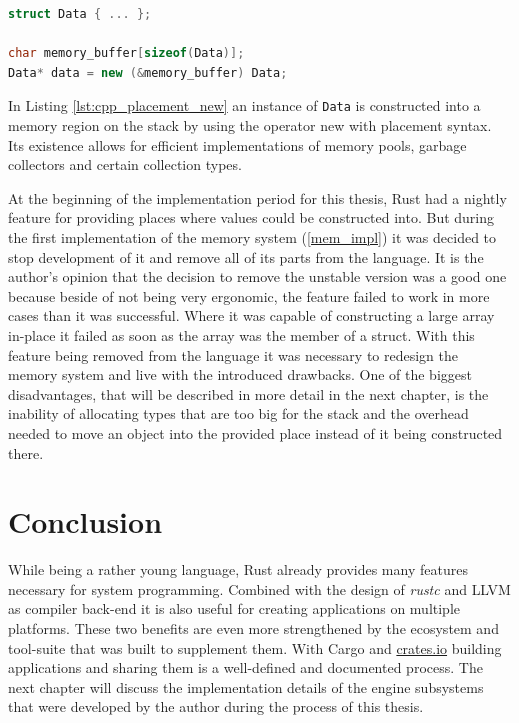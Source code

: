 \begin{lstlisting}[caption={Using placement-new to construct an object in a pre-allocated memory location}, label={lst:cpp_placement_new}, language=C++]
struct Data { ... };

char memory_buffer[sizeof(Data)];
Data* data = new (&memory_buffer) Data;
\end{lstlisting}

In Listing \ref{lst:cpp_placement_new} an instance of \texttt{Data} is constructed into a memory region on the stack by using the operator new with placement syntax. Its existence allows for efficient implementations of memory pools, garbage collectors and certain collection types.

At the beginning of the implementation period for this thesis, Rust had a nightly feature for providing places where values could be constructed into. But during the first implementation of the memory system (\ref{mem_impl}) it was decided to stop development of it and remove all of its parts from the language. It is the author's opinion that the decision to remove the unstable version was a good one because beside of not being very ergonomic, the feature failed to work in more cases than it was successful. Where it was capable of constructing a large array in-place it failed as soon as the array was the member of a struct. With this feature being removed from the language it was necessary to redesign the memory system and live with the introduced drawbacks. One of the biggest disadvantages, that will be described in more detail in the next chapter, is the inability of allocating types that are too big for the stack and the overhead needed to move an object into the provided place instead of it being constructed there.

\section{Conclusion}

While being a rather young language, Rust already provides many features necessary for system programming. Combined with the design of \textit{rustc} and \ac{LLVM} as compiler back-end it is also useful for creating applications on multiple platforms. These two benefits are even more strengthened by the ecosystem and tool-suite that was built to supplement them. With Cargo and \url{crates.io} building applications and sharing them is a well-defined and documented process. The next chapter will discuss the implementation details of the engine subsystems that were developed by the author during the process of this thesis.

